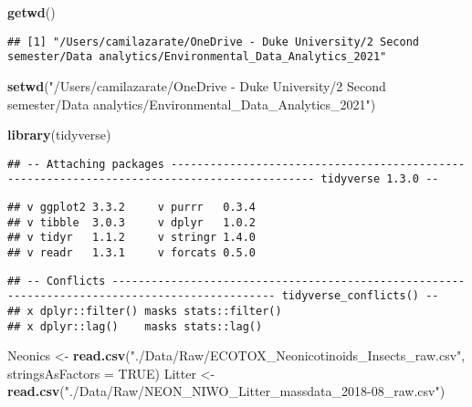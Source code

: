\documentclass[
]{article}
\newenvironment{Shaded}{\begin{snugshade}}{\end{snugshade}}
\newcommand{\DataTypeTok}[1]{\textcolor[rgb]{0.13,0.29,0.53}{#1}}
\newcommand{\KeywordTok}[1]{\textcolor[rgb]{0.13,0.29,0.53}{\textbf{#1}}}
\newcommand{\NormalTok}[1]{#1}
\newcommand{\OtherTok}[1]{\textcolor[rgb]{0.56,0.35,0.01}{#1}}
\newcommand{\StringTok}[1]{\textcolor[rgb]{0.31,0.60,0.02}{#1}}
\begin{document}
\begin{Shaded}
\begin{Highlighting}[]
\KeywordTok{getwd}\NormalTok{()}
\end{Highlighting}
\end{Shaded}

\begin{verbatim}
## [1] "/Users/camilazarate/OneDrive - Duke University/2 Second semester/Data analytics/Environmental_Data_Analytics_2021"
\end{verbatim}

\begin{Shaded}
\begin{Highlighting}[]
\KeywordTok{setwd}\NormalTok{(}\StringTok{"/Users/camilazarate/OneDrive - Duke University/2 Second semester/Data analytics/Environmental_Data_Analytics_2021"}\NormalTok{)}
\end{Highlighting}
\end{Shaded}

\begin{Shaded}
\begin{Highlighting}[]
\KeywordTok{library}\NormalTok{(tidyverse)}
\end{Highlighting}
\end{Shaded}

\begin{verbatim}
## -- Attaching packages -------------------------------------------------------------------------------------------- tidyverse 1.3.0 --
\end{verbatim}

\begin{verbatim}
## v ggplot2 3.3.2     v purrr   0.3.4
## v tibble  3.0.3     v dplyr   1.0.2
## v tidyr   1.1.2     v stringr 1.4.0
## v readr   1.3.1     v forcats 0.5.0
\end{verbatim}

\begin{verbatim}
## -- Conflicts ----------------------------------------------------------------------------------------------- tidyverse_conflicts() --
## x dplyr::filter() masks stats::filter()
## x dplyr::lag()    masks stats::lag()
\end{verbatim}

\begin{Shaded}
\begin{Highlighting}[]
\NormalTok{Neonics <-}\StringTok{ }\KeywordTok{read.csv}\NormalTok{(}\StringTok{"./Data/Raw/ECOTOX_Neonicotinoids_Insects_raw.csv"}\NormalTok{, }\DataTypeTok{stringsAsFactors =} \OtherTok{TRUE}\NormalTok{)}
\NormalTok{Litter <-}\StringTok{ }\KeywordTok{read.csv}\NormalTok{(}\StringTok{"./Data/Raw/NEON_NIWO_Litter_massdata_2018-08_raw.csv"}\NormalTok{)}
\end{Highlighting}
\end{Shaded}
\end{document}
